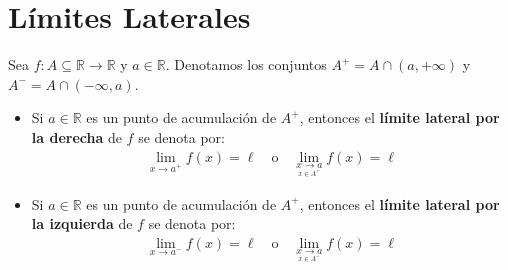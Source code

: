 \documentclass[12pt]{book}
\begin{document}
\section{Límites Laterales}

\begin{defi}{}{}
    Sea $f : A \subseteq \mathbb{R} \to \mathbb{R}$ y $a \in \mathbb{R}$. Denotamos los conjuntos $A^+=A \cap (a,+\infty)$ y $A^{-}=A\cap (-\infty,a)$.
    \begin{itemize}
        \item Si $a \in \mathbb{R}$ es un punto de acumulación de $A^+$, entonces el \textbf{límite lateral por la derecha} de $f$ se denota por:
\begin{align*}
    \lim_{x\to a^+}f(x)=\ell\quad \text{o} \quad \lim_{\underset{x \in A^+}{x\to a}}f(x)=\ell
\end{align*}

 \item Si $a \in \mathbb{R}$ es un punto de acumulación de $A^+$, entonces el \textbf{límite lateral por la izquierda} de $f$ se denota por:
 \begin{align*}
    \lim_{x\to a^-}f(x)=\ell\quad \text{o} \quad \lim_{\underset{x \in A^-}{x\to a}}f(x)=\ell
\end{align*}
    \end{itemize}
\end{defi}
\end{document}
